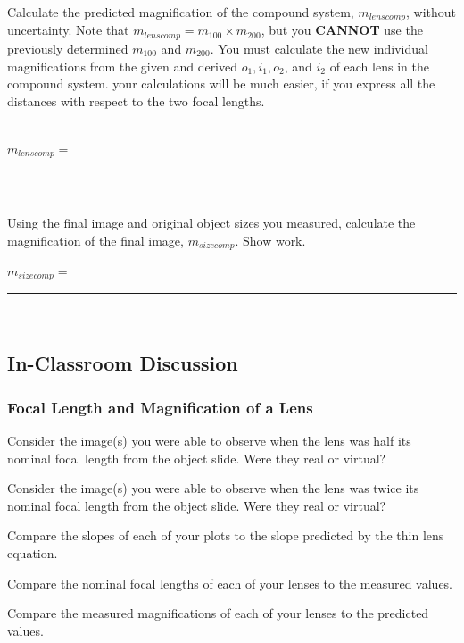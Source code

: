 \noindent
Calculate the predicted magnification of the compound system, $m_{lenscomp}$,
without uncertainty.  Note that $m_{lenscomp}=m_{100}\times m_{200}$, but you
{\bf CANNOT} use the previously determined $m_{100}$ and $m_{200}$. You must
calculate the new individual magnifications from the given and derived
$o_1, i_1, o_2$, and $i_2$ of each lens in the compound system. your
calculations will be much easier, if you express all the distances with respect
to the two focal lengths. \\
\vspace*{2cm} \\
\begin{center}
$m_{lenscomp}=$~\rule{3cm}{.1mm} \\
\end{center}
\noindent 
Using the final image and original object sizes you measured, 
calculate the magnification 
of the final image, $m_{sizecomp}.$ 
Show work. \\
\vspace*{3cm} 
\begin{center}
$m_{sizecomp}=$~\rule{3cm}{.1mm} ~~~~
\end{center}


\subsection{In-Classroom Discussion}
\subsubsection{Focal Length and Magnification of a Lens}
Consider the image(s) you were able to observe when the lens was half its
nominal focal length from the object slide. Were they real or virtual?
\vspace*{.3cm}

\noindent
Consider the image(s) you were able to observe when the lens was twice its
nominal focal length from the object slide. Were they real or virtual?
\vspace*{.3cm}


\noindent
Compare the slopes of each of your plots to the slope predicted by the thin lens
equation.
\vspace*{2.4cm}

\noindent 
Compare the nominal focal lengths of each of your lenses to the measured
values.
\vspace*{2.4cm}

\noindent
Compare the measured magnifications of each of your lenses to the predicted
values.
\vspace*{2.4cm}

